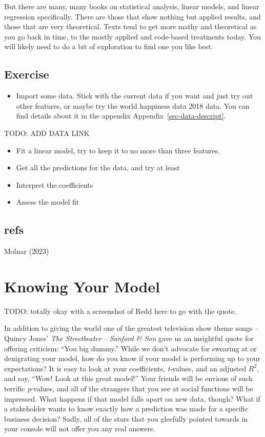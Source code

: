 \documentclass[
  letterpaper,
]{krantz}
\providecommand{\tightlist}{%
  \setlength{\itemsep}{0pt}\setlength{\parskip}{0pt}}\usepackage{longtable,booktabs,array}
\begin{document}
But there are many, many books on statistical analysis, linear models,
and linear regression specifically. There are those that show nothing
but applied results, and those that are very theoretical. Texts tend to
get more mathy and theoretical as you go back in time, to the mostly
applied and code-based treatments today. You will likely need to do a
bit of exploration to find one you like best.

\section{Exercise}\label{sec-lm-exercise}

\begin{itemize}
\tightlist
\item
  Import some data. Stick with the current data if you want and just try
  out other features, or maybe try the world happiness data 2018 data.
  You can find details about it in the appendix
  Appendix~\ref{sec-data-descript}.
\end{itemize}

TODO: ADD DATA LINK

\begin{itemize}
\tightlist
\item
  Fit a linear model, try to keep it to no more than three features.
\item
  Get all the predictions for the data, and try at least
\item
  Interpret the coefficients
\item
  Assess the model fit
\end{itemize}

\section{refs}\label{refs}

Molnar (2023)

\chapter{Knowing Your Model}\label{sec-knowing}

TODO: totally okay with a screenshot of Redd here to go with the quote.

In addition to giving the world one of the greatest television show
theme songs -- Quincy Jones' \emph{The Streetbeater} -- \emph{Sanford \&
Son} gave us an insightful quote for offering criticism: ``You big
dummy.'' While we don't advocate for swearing at or denigrating your
model, how do you know if your model is performing up to your
expectations? It is easy to look at your coefficients, \emph{t}-values,
and an adjusted \(R^2\), and say, ``Wow! Look at this great model!''
Your friends will be envious of such terrific \emph{p}-values, and all
of the strangers that you see at social functions will be impressed.
What happens if that model falls apart on new data, though? What if a
stakeholder wants to know exactly how a prediction was made for a
specific business decision? Sadly, all of the stars that you gleefully
pointed towards in your console will not offer you any real answers.
\end{document}
